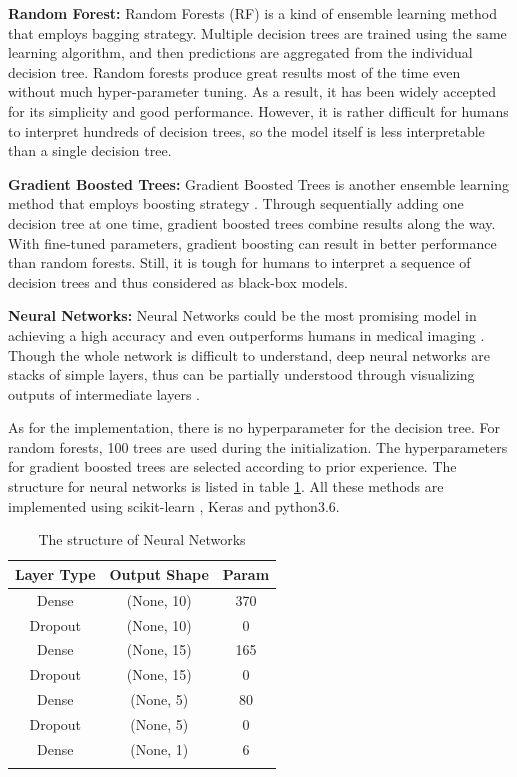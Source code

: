 \textbf{Random Forest:} Random Forests (RF) is a kind of ensemble learning method \cite{Breiman2001Random} that employs bagging strategy. Multiple decision trees are trained using the same learning algorithm, and then predictions are aggregated from the individual decision tree. Random forests produce great results most of the time even without much hyper-parameter tuning. As a result, it has been widely accepted for its simplicity and good performance. However, it is rather difficult for humans to interpret hundreds of decision trees, so the model itself is less interpretable than a single decision tree.

\textbf{Gradient Boosted Trees:} Gradient Boosted Trees is another ensemble learning method that employs boosting strategy \cite{gbtrees}. Through sequentially adding one decision tree at one time, gradient boosted trees combine results along the way. With fine-tuned parameters, gradient boosting can result in better performance than random forests. Still, it is tough for humans to interpret a sequence of decision trees and thus considered as black-box models.

\textbf{Neural Networks:} Neural Networks could be the most promising model in achieving a high accuracy and even outperforms humans in medical imaging \cite{maier2018gentle}. Though the whole network is difficult to understand, deep neural networks are stacks of simple layers, thus can be partially understood through visualizing outputs of intermediate layers \cite{Montavon_2018}.


As for the implementation, there is no hyperparameter for the decision tree. For random forests, 100 trees are used during the initialization. The hyperparameters for gradient boosted trees are selected according to prior experience. The structure for neural networks is listed in table \ref{tab:nn}. All these methods are implemented using scikit-learn \cite{scikit-learn}, Keras and python3.6.

\begin{table}[H]
\centering
\caption{The structure of Neural Networks}
\begin{tabular}{@{}ccc@{}}
\toprule
Layer Type   & Output Shape & Param \\ \midrule
Dense & (None, 10) & 370           \\
Dropout & (None, 10) & 0           \\
Dense & (None, 15) & 165           \\
Dropout & (None, 15) & 0           \\
Dense & (None, 5) & 80           \\
Dropout & (None, 5) & 0           \\
Dense & (None, 1) & 6           \\
\bottomrule
\label{tab:nn}
\end{tabular}
\end{table}

